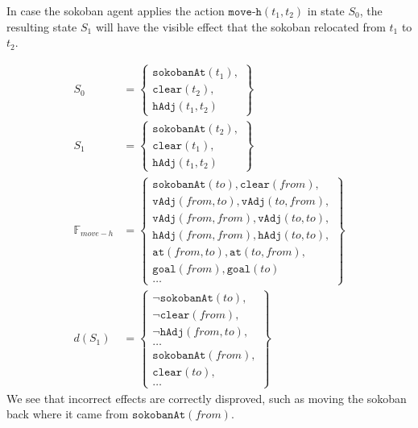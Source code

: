 \documentclass[../Master.tex]{subfiles}
\begin{document}
\begin{example} \label{ex:nca:moveSucceeded-disproving-effects}
	In case the sokoban agent applies the action $\texttt{move-h}(t_1, t_2)$ in state $S_0$, the resulting state $S_1$ will have the visible effect that the sokoban relocated from $t_1$ to $t_2$. 
	
	
	
	\begin{equation*}
		\begin{split}
		S_0 &=
		\left\{
		\begin{gathered}
			\texttt{sokobanAt}(t_1), \\
			\texttt{clear}(t_2),\\
			\texttt{hAdj}(t_1, t_2)	
		\end{gathered}
		\right\} \\
		S_1 &=
		\left\{
		\begin{gathered}
			\texttt{sokobanAt}(t_2), \\
			\texttt{clear}(t_1), \\
			\texttt{hAdj}(t_1, t_2)			
		\end{gathered}
		\right\} \\		
		\mathbb{F}_{move-h} &= \left\{
		\begin{gathered}
			\texttt{sokobanAt}(to), \texttt{clear}(from), \\
			\texttt{vAdj}(from, to), \texttt{vAdj}(to, from), \\
			\texttt{vAdj}(from, from), \texttt{vAdj}(to, to), \\
			\texttt{hAdj}(from, from), \texttt{hAdj}(to, to), \\
			\texttt{at}(from, to), \texttt{at}(to, from), \\
			\texttt{goal}(from), \texttt{goal}(to)  \\
			\dots
		\end{gathered}
		\right\} \\
		d(S_1) &= \left\{
		\begin{gathered}
			\neg \texttt{sokobanAt}(to), \\
			\neg \texttt{clear}(from), \\
			\neg \texttt{hAdj}(from, to), \\
			\dots \\
			\texttt{sokobanAt}(from), \\
			\texttt{clear}(to), \\
			\dots			
		\end{gathered}
		\right\}
		\end{split}
	\end{equation*}
We see that incorrect effects are correctly disproved, such as moving the sokoban back where it came from $\texttt{sokobanAt}(from)$.
\end{example}
\end{document}
